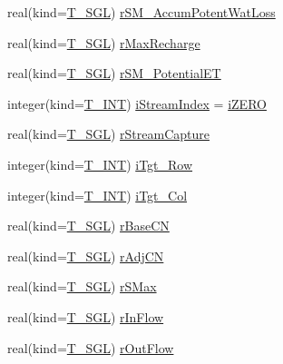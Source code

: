\begin{DoxyCompactItemize}
\item 
real(kind=\hyperlink{namespacetypes_af3012489af4c138f271f1bce244b7e51}{T\_\-SGL}) \hyperlink{typetypes_1_1_t___c_e_l_l_ae70c55ab7eae348ffa8225f8d73ec73d}{rSM\_\-AccumPotentWatLoss}
\item 
real(kind=\hyperlink{namespacetypes_af3012489af4c138f271f1bce244b7e51}{T\_\-SGL}) \hyperlink{typetypes_1_1_t___c_e_l_l_a9b095ffb106e69e548d435ed432be83a}{rMaxRecharge}
\item 
real(kind=\hyperlink{namespacetypes_af3012489af4c138f271f1bce244b7e51}{T\_\-SGL}) \hyperlink{typetypes_1_1_t___c_e_l_l_aaac7498ec7bb6967cb37ecdf98476a2d}{rSM\_\-PotentialET}
\item 
integer(kind=\hyperlink{namespacetypes_a4e4d040a4425196c4d43be63e7e6103a}{T\_\-INT}) \hyperlink{typetypes_1_1_t___c_e_l_l_a939135f069fa7c1db557789237a3a712}{iStreamIndex} = \hyperlink{namespacetypes_a694f00629aa7084d30ef27a0f233de5a}{iZERO}
\item 
real(kind=\hyperlink{namespacetypes_af3012489af4c138f271f1bce244b7e51}{T\_\-SGL}) \hyperlink{typetypes_1_1_t___c_e_l_l_aa1489c4df446c844537b8322d2b24f27}{rStreamCapture}
\item 
integer(kind=\hyperlink{namespacetypes_a4e4d040a4425196c4d43be63e7e6103a}{T\_\-INT}) \hyperlink{typetypes_1_1_t___c_e_l_l_aa4f32ace62145583810423f97cae581b}{iTgt\_\-Row}
\item 
integer(kind=\hyperlink{namespacetypes_a4e4d040a4425196c4d43be63e7e6103a}{T\_\-INT}) \hyperlink{typetypes_1_1_t___c_e_l_l_ae505e6b7b939a3f96079a70c73cab67a}{iTgt\_\-Col}
\item 
real(kind=\hyperlink{namespacetypes_af3012489af4c138f271f1bce244b7e51}{T\_\-SGL}) \hyperlink{typetypes_1_1_t___c_e_l_l_a7410573cf8d106abd2302cfba636cbbf}{rBaseCN}
\item 
real(kind=\hyperlink{namespacetypes_af3012489af4c138f271f1bce244b7e51}{T\_\-SGL}) \hyperlink{typetypes_1_1_t___c_e_l_l_a8d7ee5136c4c7c6a767beb0c3784e2df}{rAdjCN}
\item 
real(kind=\hyperlink{namespacetypes_af3012489af4c138f271f1bce244b7e51}{T\_\-SGL}) \hyperlink{typetypes_1_1_t___c_e_l_l_a89931b889ff575f122000526cab5ece9}{rSMax}
\item 
real(kind=\hyperlink{namespacetypes_af3012489af4c138f271f1bce244b7e51}{T\_\-SGL}) \hyperlink{typetypes_1_1_t___c_e_l_l_a236f20cb8f380308c27d0f5d5dceba75}{rInFlow}
\item 
real(kind=\hyperlink{namespacetypes_af3012489af4c138f271f1bce244b7e51}{T\_\-SGL}) \hyperlink{typetypes_1_1_t___c_e_l_l_ae3d510b213a17293c243a85b6e2eb133}{rOutFlow}

\end{DoxyCompactItemize}
